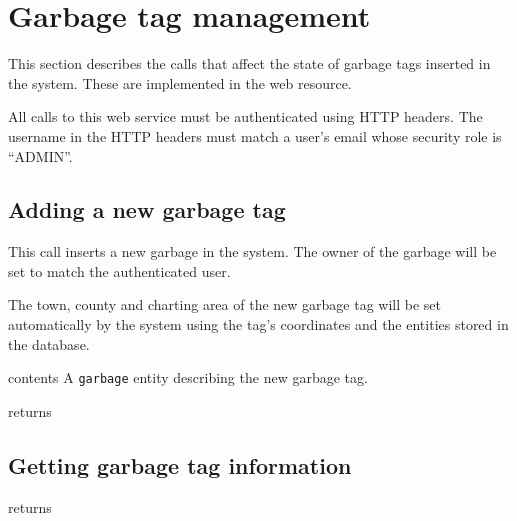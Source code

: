 \section{Garbage tag management}

This section describes the calls that affect the state of garbage tags inserted
in the system. These are implemented in the
 web
resource.

All calls to this web service must be authenticated using HTTP headers. The
username in the HTTP headers must match a user's email whose security role is
``ADMIN''.


\subsection{Adding a new garbage tag}

This call inserts a new garbage in the system. The owner of the garbage will be
set to match the authenticated user.

The town, county and charting area of the new garbage tag will be set
automatically by the system using the tag's coordinates and the entities stored
in the database.

\begin{apidata}{contents}
  A \texttt{garbage} entity describing the new garbage tag.
\end{apidata}
\begin{apidata}{returns}
  \begin{datalist}
  \end{datalist}
\end{apidata}


\subsection{Getting garbage tag information}

\begin{apidata}{returns}
  \begin{datalist}
  \end{datalist}
\end{apidata}

